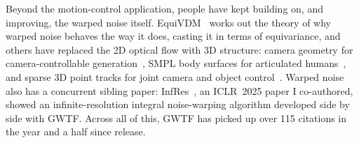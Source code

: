Beyond the motion-control application, people have kept building on, and improving, the warped noise itself. 
EquiVDM~\cite{liu2025equivdm} works out the theory of why warped noise behaves the way it does, casting it in terms of equivariance, and others have replaced the 2D optical flow with 3D structure: camera geometry for camera-controllable generation~\cite{cameranoise2026}, SMPL body surfaces for articulated humans~\cite{humandiff2026}, and sparse 3D point tracks for joint camera and object control~\cite{unicamo2026}. Warped noise also has a concurrent sibling paper: InfRes~\cite{deng2025infres}, an ICLR~2025 paper I co-authored, showed an infinite-resolution integral noise-warping algorithm developed side by side with GWTF. Across all of this, GWTF has picked up over 115 citations in the year and a half since release.


